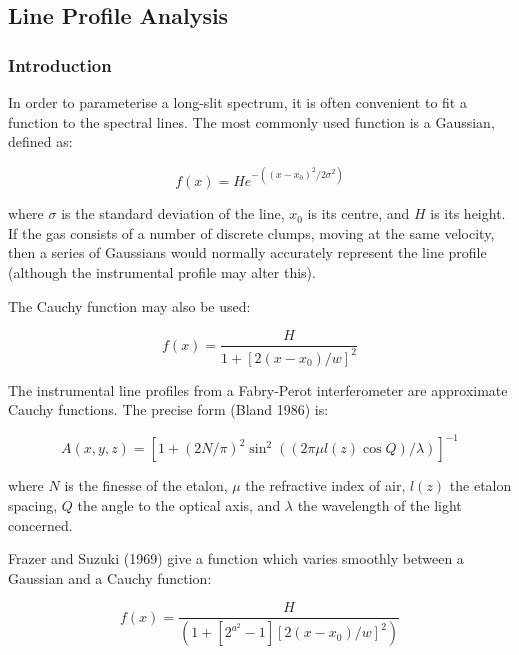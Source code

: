 \subsection{\label{line_profile_analysis}Line Profile Analysis}

\subsubsection{Introduction}

In order to parameterise a long-slit spectrum, it is often
convenient to fit a function to the spectral lines.
The most commonly used function is a Gaussian, defined as:

\begin{equation}
     f(x) = H e^{-((x-x_{0})^{2}/2\sigma^{2})}
\end{equation}

where $\sigma$ is the standard deviation of the line, $x_{0}$ is its
centre, and $H$ is its height.
If the gas consists of a number of discrete clumps, moving at the same
velocity, then a series of Gaussians would normally accurately represent
the line profile (although the instrumental profile may alter this).

The Cauchy function may also be used:

\begin{equation}
     f(x) = \frac{H}{1+[2(x-x_{0})/w]^{2}}
\end{equation}

The instrumental line profiles from a Fabry-Perot interferometer are
approximate Cauchy functions.
The precise form (Bland 1986) is:

\begin{equation}
A(x,y,z) = [1+(2N/\pi )^{2}\sin^{2}((2\pi \mu l(z)\cos Q)/\lambda )]^{-1}
\end{equation}

where $N$ is the finesse of the etalon, $\mu$ the refractive index of
air, $l(z)$ the etalon spacing, $Q$ the angle to the optical axis, and
$\lambda$ the wavelength of the light concerned.

Frazer and Suzuki (1969) give a function which varies smoothly between a
Gaussian and a Cauchy function:

\begin{equation}
     f(x) = \frac{H}{(1+[2^{a^{2}}-1][2(x-x_{0})/w]^{2})}
\label{eq_varcauchy}
\end{equation}


